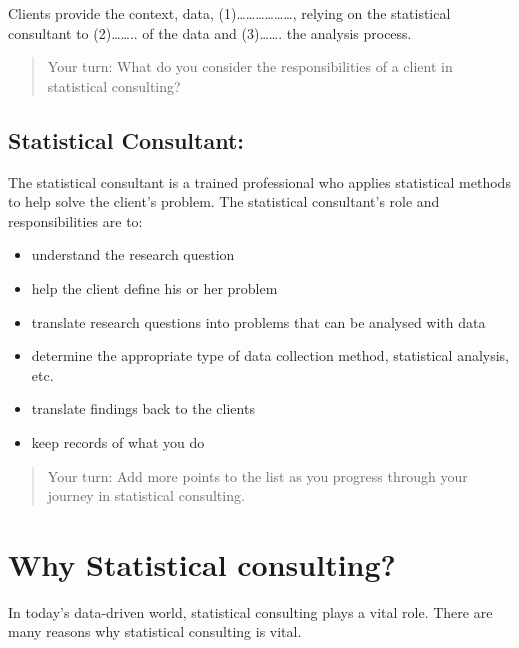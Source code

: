 \documentclass[
  letterpaper,
  DIV=11,
  numbers=noendperiod]{scrreprt}
\begin{document}
Clients provide the context, data,
(1)\ldots\ldots\ldots\ldots\ldots\ldots, relying on the statistical
consultant to (2)\ldots\ldots.. of the data and (3)\ldots\ldots. the
analysis process.

\begin{quote}
Your turn: What do you consider the responsibilities of a client in
statistical consulting?
\end{quote}

\subsection{Statistical Consultant:}\label{statistical-consultant}

The statistical consultant is a trained professional who applies
statistical methods to help solve the client's problem. The statistical
consultant's role and responsibilities are to:

\begin{itemize}
\item
  understand the research question
\item
  help the client define his or her problem
\item
  translate research questions into problems that can be analysed with
  data
\item
  determine the appropriate type of data collection method, statistical
  analysis, etc.
\item
  translate findings back to the clients
\item
  keep records of what you do
\end{itemize}

\begin{quote}
Your turn: Add more points to the list as you progress through your
journey in statistical consulting.
\end{quote}

\section{Why Statistical consulting?}\label{why-statistical-consulting}

In today's data-driven world, statistical consulting plays a vital role.
There are many reasons why statistical consulting is vital.
\end{document}
